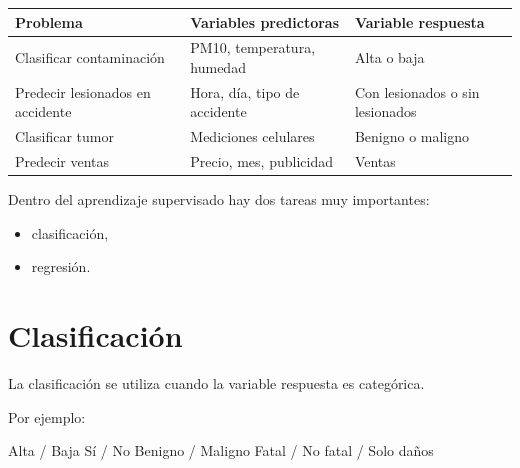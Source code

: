 \documentclass[
  11pt,
  letterpaper,
]{book}
\newenvironment{Shaded}{\begin{snugshade}}{\end{snugshade}}
\newcommand{\NormalTok}[1]{\textcolor[rgb]{0.00,0.23,0.31}{#1}}
\newcounter{none} %
\providecommand{\tightlist}{%
  \setlength{\itemsep}{0pt}\setlength{\parskip}{0pt}}
\begin{document}
{\def\LTcaptype{none} %
\begin{longtable}[]{@{}
  >{\raggedright\arraybackslash}p{}
  >{\raggedright\arraybackslash}p{}
  >{\raggedright\arraybackslash}p{}@{}}
\toprule\noalign{}
\begin{minipage}[b]{\linewidth}\raggedright
Problema
\end{minipage} & \begin{minipage}[b]{\linewidth}\raggedright
Variables predictoras
\end{minipage} & \begin{minipage}[b]{\linewidth}\raggedright
Variable respuesta
\end{minipage} \\
\midrule\noalign{}
\endhead
\bottomrule\noalign{}
\endlastfoot
Clasificar contaminación & PM10, temperatura, humedad & Alta o baja \\
Predecir lesionados en accidente & Hora, día, tipo de accidente & Con
lesionados o sin lesionados \\
Clasificar tumor & Mediciones celulares & Benigno o maligno \\
Predecir ventas & Precio, mes, publicidad & Ventas \\
\end{longtable}
}

Dentro del aprendizaje supervisado hay dos tareas muy importantes:

\begin{itemize}
\tightlist
\item
  clasificación,
\item
  regresión.
\end{itemize}

\section{Clasificación}\label{clasificaciuxf3n}

La clasificación se utiliza cuando la variable respuesta es categórica.

Por ejemplo:

\begin{Shaded}
\begin{Highlighting}[]
\NormalTok{Alta / Baja}
\NormalTok{Sí / No}
\NormalTok{Benigno / Maligno}
\NormalTok{Fatal / No fatal / Solo daños}
\end{Highlighting}
\end{Shaded}
\end{document}
